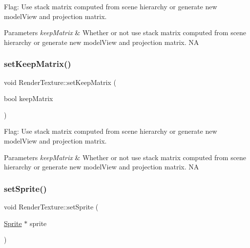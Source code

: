 Flag\+: Use stack matrix computed from scene hierarchy or generate new model\+View and projection matrix.


\begin{DoxyParams}{Parameters}
{\em keep\+Matrix} & Whether or not use stack matrix computed from scene hierarchy or generate new model\+View and projection matrix.  NA \\
\hline
\end{DoxyParams}
\mbox{\label{classRenderTexture_a9cfc0e640f5e3ddf666bd3b7b735991a}} 
\subsubsection{\texorpdfstring{set\+Keep\+Matrix()}{setKeepMatrix()}\hspace{0.1cm}{\footnotesize\ttfamily [2/2]}}
{\footnotesize\ttfamily void Render\+Texture\+::set\+Keep\+Matrix (\begin{DoxyParamCaption}\item[{bool}]{keep\+Matrix }\end{DoxyParamCaption})}

Flag\+: Use stack matrix computed from scene hierarchy or generate new model\+View and projection matrix.


\begin{DoxyParams}{Parameters}
{\em keep\+Matrix} & Whether or not use stack matrix computed from scene hierarchy or generate new model\+View and projection matrix.  NA \\
\hline
\end{DoxyParams}
\mbox{\label{classRenderTexture_a68570f2b0fe7e04eb842a3ab11ffd7f7}} 
\subsubsection{\texorpdfstring{set\+Sprite()}{setSprite()}\hspace{0.1cm}{\footnotesize\ttfamily [1/2]}}
{\footnotesize\ttfamily void Render\+Texture\+::set\+Sprite (\begin{DoxyParamCaption}\item[{\hyperlink{classSprite}{Sprite} $\ast$}]{sprite }\end{DoxyParamCaption})}

